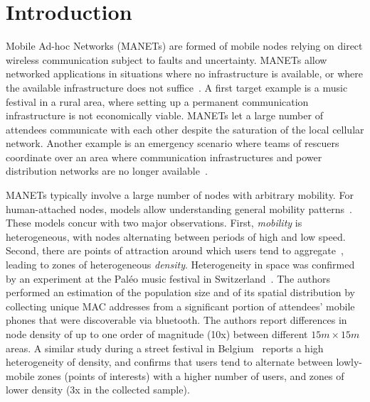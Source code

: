 
\section{Introduction}
\label{sec:introduction}

Mobile Ad-hoc Networks (MANETs) are formed of mobile nodes relying on direct wireless communication subject to faults and uncertainty.
MANETs allow networked applications in situations where no infrastructure is available, or where the available infrastructure does not suffice~\citep{overview_adhoc_networks,Bellavista2013}.
A first target example is a music festival in a rural area, where setting up a permanent communication infrastructure is not economically viable.
MANETs let a large number of attendees communicate with each other despite the saturation of the local cellular network.
Another example is an emergency scenario where teams of rescuers coordinate over an area where communication infrastructures and power distribution networks are no longer available~\citep{lieser2017architecture,verma2015manet}.

MANETs typically involve a large number of nodes with arbitrary mobility.
For human-attached nodes, models allow understanding general mobility patterns~\citep{Hess:2015:DHM:2856149.2840722,rhee2011levy}.
These models concur with two major observations.
First, \emph{mobility} is heterogeneous, with nodes alternating between periods of high and low speed.
Second, there are points of attraction around which users tend to aggregate~\citep{stepanov2005mobility_model_outdoor}, leading to zones of heterogeneous \emph{density}.
Heterogeneity in space was confirmed by an experiment at the Paléo music festival in Switzerland~\citep{naini2015opportunistic}.
The authors performed an estimation of the population size and of its spatial distribution by collecting unique MAC addresses from a significant portion of attendees' mobile phones that were discoverable via bluetooth.
The authors report differences in node density of up to one order of magnitude (10x) between different $15m\times 15m$ areas.
A similar study during a street festival in Belgium~\citep{versichele2012use} reports a high heterogeneity of density, and confirms that users tend to alternate between lowly-mobile zones (points of interests) with a higher number of users, and zones of lower density (3x in the collected sample).



